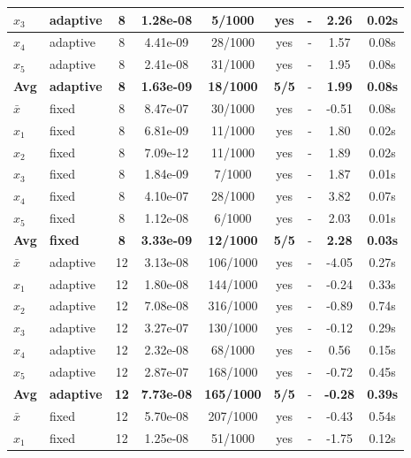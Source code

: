 \begin{longtable}{|l|l|c|c|c|c|c|c|c|}
\hline
$x_3$ & adaptive & 8 & 1.28e-08 & 5/1000 & yes & - & 2.26 & 0.02s \\
\hline
$x_4$ & adaptive & 8 & 4.41e-09 & 28/1000 & yes & - & 1.57 & 0.08s \\
\hline
$x_5$ & adaptive & 8 & 2.41e-08 & 31/1000 & yes & - & 1.95 & 0.08s \\
\hline
\hline\hline
\textbf{Avg} & \textbf{adaptive} & \textbf{8} & \textbf{1.63e-09} & \textbf{18/1000} & \textbf{5/5} & - & \textbf{1.99} & \textbf{0.08s} \\
\hline\hline
\hline
$\bar{x}$ & fixed & 8 & 8.47e-07 & 30/1000 & yes & - & -0.51 & 0.08s \\
\hline
$x_1$ & fixed & 8 & 6.81e-09 & 11/1000 & yes & - & 1.80 & 0.02s \\
\hline
$x_2$ & fixed & 8 & 7.09e-12 & 11/1000 & yes & - & 1.89 & 0.02s \\
\hline
$x_3$ & fixed & 8 & 1.84e-09 & 7/1000 & yes & - & 1.87 & 0.01s \\
\hline
$x_4$ & fixed & 8 & 4.10e-07 & 28/1000 & yes & - & 3.82 & 0.07s \\
\hline
$x_5$ & fixed & 8 & 1.12e-08 & 6/1000 & yes & - & 2.03 & 0.01s \\
\hline
\hline\hline
\textbf{Avg} & \textbf{fixed} & \textbf{8} & \textbf{3.33e-09} & \textbf{12/1000} & \textbf{5/5} & - & \textbf{2.28} & \textbf{0.03s} \\
\hline\hline
$\bar{x}$ & adaptive & 12 & 3.13e-08 & 106/1000 & yes & - & -4.05 & 0.27s \\
\hline
$x_1$ & adaptive & 12 & 1.80e-08 & 144/1000 & yes & - & -0.24 & 0.33s \\
\hline
$x_2$ & adaptive & 12 & 7.08e-08 & 316/1000 & yes & - & -0.89 & 0.74s \\
\hline
$x_3$ & adaptive & 12 & 3.27e-07 & 130/1000 & yes & - & -0.12 & 0.29s \\
\hline
$x_4$ & adaptive & 12 & 2.32e-08 & 68/1000 & yes & - & 0.56 & 0.15s \\
\hline
$x_5$ & adaptive & 12 & 2.87e-07 & 168/1000 & yes & - & -0.72 & 0.45s \\
\hline
\hline\hline
\textbf{Avg} & \textbf{adaptive} & \textbf{12} & \textbf{7.73e-08} & \textbf{165/1000} & \textbf{5/5} & - & \textbf{-0.28} & \textbf{0.39s} \\
\hline\hline
\hline
$\bar{x}$ & fixed & 12 & 5.70e-08 & 207/1000 & yes & - & -0.43 & 0.54s \\
\hline
$x_1$ & fixed & 12 & 1.25e-08 & 51/1000 & yes & - & -1.75 & 0.12s \\

\end{longtable}

